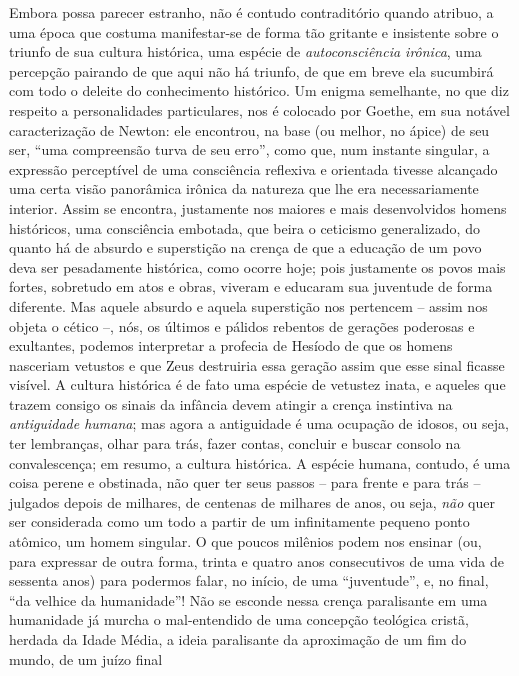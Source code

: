Embora possa parecer estranho, não é contudo contraditório quando
atribuo, a uma época que costuma manifestar-se de forma tão gritante e
insistente sobre o triunfo de sua cultura histórica, uma espécie de
\emph{autoconsciência irônica}, uma percepção pairando de que aqui não
há triunfo, de que em breve ela sucumbirá com todo o deleite do
conhecimento histórico. Um enigma semelhante, no que diz respeito a
personalidades particulares, nos é colocado por Goethe, em sua notável
caracterização de Newton: ele encontrou, na base (ou melhor, no ápice)
de seu ser, ``uma compreensão turva de seu erro'', como que, num
instante singular, a expressão perceptível de uma consciência reflexiva
e orientada tivesse alcançado uma certa visão panorâmica irônica da
natureza que lhe era necessariamente interior. Assim se encontra,
justamente nos maiores e mais desenvolvidos homens históricos, uma
consciência embotada, que beira o ceticismo generalizado, do quanto há
de absurdo e superstição na crença de que a educação de um povo deva ser
pesadamente histórica, como ocorre hoje; pois justamente os povos mais
fortes, sobretudo em atos e obras, viveram e educaram sua juventude de
forma diferente. Mas aquele absurdo e aquela superstição nos pertencem
-- assim nos objeta o cético --, nós, os últimos e pálidos rebentos de
gerações poderosas e exultantes, podemos interpretar a profecia de
Hesíodo de que os homens nasceriam vetustos e que Zeus destruiria essa
geração assim que esse sinal ficasse visível. A cultura histórica é de
fato uma espécie de vetustez inata, e aqueles que trazem consigo os
sinais da infância devem atingir a crença instintiva na
\emph{antiguidade humana}; mas agora a antiguidade é uma ocupação de
idosos, ou seja, ter lembranças, olhar para trás, fazer contas, concluir
e buscar consolo na convalescença; em resumo, a cultura histórica. A
espécie humana, contudo, é uma coisa perene e obstinada, não quer ter
seus passos -- para frente e para trás -- julgados depois de milhares,
de centenas de milhares de anos, ou seja, \emph{não} quer ser
considerada como um todo a partir de um infinitamente pequeno ponto
atômico, um homem singular. O que poucos milênios podem nos ensinar (ou,
para expressar de outra forma, trinta e quatro anos consecutivos de uma
vida de sessenta anos) para podermos falar, no início, de uma
``juventude'', e, no final, ``da velhice da humanidade''! Não se esconde
nessa crença paralisante em uma humanidade já murcha o mal-entendido de
uma concepção teológica cristã, herdada da Idade Média, a ideia
paralisante da aproximação de um fim do mundo, de um juízo final
